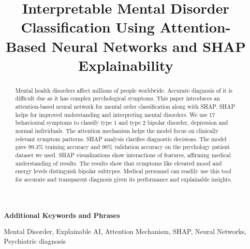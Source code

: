 \documentclass[conference]{IEEEtran}
\begin{document}
\title{Interpretable Mental Disorder Classification Using Attention-Based Neural Networks and SHAP Explainability}

\author{
\and 
{}
\and 
{}
}

\maketitle
\begin{abstract}
Mental health disorders affect millions of people worldwide. Accurate diagnosis of it is difficult due as it has complex psychological symptoms. This paper introduces an attention-based neural network for mental order classification along with SHAP. SHAP helps for improved understanding and interpreting mental disorders. We use 17 behavioural symptoms to classify type 1 and type 2 bipolar disorder, depression and normal individuals. The attention mechanism helps the model focus on clinically relevant symptom patterns. SHAP analysis clarifies diagnostic decisions. The model gave 99.3\% training accuracy and 90\% validation accuracy on the psychology patient dataset we used. SHAP visualizations show interactions of features, affirming medical understanding of results. The results show that symptoms like elevated mood and energy levels distinguish bipolar subtypes. Medical personnel can readily use this tool for accurate and transparent diagnosis given its performance and explainable insights.
\end{abstract}


\textbf{Additional Keywords and Phrases}

Mental Disorder, Explainable AI, Attention Mechanism, SHAP, Neural Networks, Psychiatric diagnosis
\end{document}

